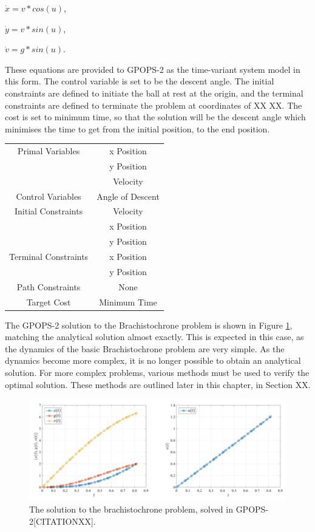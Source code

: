 $\dot{x} = v*cos(u)$,

$\dot{y} = v*sin(u)$,

$\dot{v} = g*sin(u)$.

\noindent These equations are provided to GPOPS-2 as the time-variant system model in this form. The control variable is set to be the descent angle. The initial constraints are defined to initiate the ball at rest at the origin, and the terminal constraints are defined to terminate the problem at coordinates of XX XX. The cost is set to minimum time, so that the solution will be the descent angle which minimises the time to get from the initial position, to the end position. 

\begin{table}
	\centering
	\begin{tabular}{|c|c|}
		\hline Primal Variables  & x Position\\& y Position\\& Velocity\\ 
		\hline Control Variables  & Angle of Descent\\ 
		\hline Initial Constraints  & Velocity\\ & x Position\\ & y Position\\
		\hline Terminal Constraints &  x Position\\ & y Position\\
		\hline Path Constraints & None \\ 
		\hline Target Cost & Minimum Time \\ 
		\hline 
	\end{tabular} 
\end{table}


The GPOPS-2 solution to the Brachistochrone problem is shown in Figure \ref{fig:Brachistochrone}, matching the analytical solution almost exactly. This is expected in this case, as the dynamics of the basic Brachistochrone problem are very simple. As the dynamics become more complex, it is no longer possible to obtain an analytical solution. For more complex problems, various methods must be used to verify the optimal solution. These methods are outlined later in this chapter, in Section XX.  

\begin{figure}[ht]
	\centering
	\includegraphics[width=0.9\linewidth]{figures/4_LODESTAR/Brachistochrone}
	\caption{The solution to the brachistochrone problem, solved in GPOPS-2[CITATIONXX].}
	\label{fig:Brachistochrone}
\end{figure}










